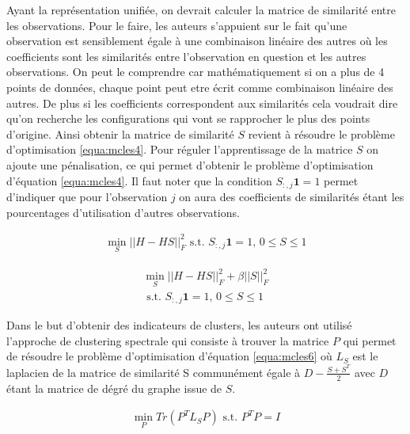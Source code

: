 \documentclass[12pt, french, latin.medieval, a4paper]{report}
\begin{document}
	Ayant la représentation unifiée, on devrait calculer la matrice de similarité entre les observations. Pour le faire, les auteurs s'appuient sur le fait qu'une observation est sensiblement égale à une combinaison linéaire des autres où les coefficients sont les similarités entre l'observation en question et les autres observations. 
	On peut le comprendre car mathématiquement si on a plus de 4 points de données, chaque point peut etre écrit comme combinaison linéaire des autres. De plus si les coefficients correspondent aux similarités cela voudrait dire qu'on recherche les configurations qui vont se rapprocher le plus des points d'origine. 
	Ainsi obtenir la matrice de similarité $S$ revient à résoudre le problème d'optimisation \ref{equa:mcles4}. Pour réguler l'apprentissage de la matrice $S$ on ajoute une pénalisation, ce qui permet d'obtenir le problème d'optimisation d'équation \ref{equa:mcles4}. 
	Il faut noter que la condition $S_{:,j}\textbf{1}=1$ permet d'indiquer que pour l'observation $j$ on aura des coefficients de similarités étant les pourcentages d'utilisation d'autres observations. 

	\begin{equation}
    	\begin{aligned}
        	\min_{S} {|| H - HS ||}_F^2 \text{  s.t. $S_{:,j}\textbf{1}=1$, $0\leq S \leq1$}
    	\end{aligned}
    	\label{equa:mcles4}
	\end{equation}

	\begin{equation}
    	\begin{aligned}
        	\min_{S} {|| H - HS ||}_F^2 + \beta {|| S ||}_F^2 \\
        	\text{  s.t. $S_{:,j}\textbf{1}=1$, $0\leq S \leq1$}
    	\end{aligned}
    	\label{equa:mcles5}
	\end{equation}

	Dans le but d'obtenir des indicateurs de clusters, les auteurs ont utilisé l'approche de clustering spectrale qui consiste à trouver la matrice $P$ qui permet de résoudre le problème d'optimisation d'équation \ref{equa:mcles6} où $L_S$ est le laplacien de la matrice de similarité S communément égale à $D - \frac{S+S^T}{2}$ avec $D$ étant la matrice de dégré du graphe issue de $S$.

	\begin{equation}
    	\begin{aligned}
        	\min_{P} Tr(P^TL_SP)  \text{  s.t. $P^TP =I$}
    	\end{aligned}
    	\label{equa:mcles6}
	\end{equation}
\end{document}
